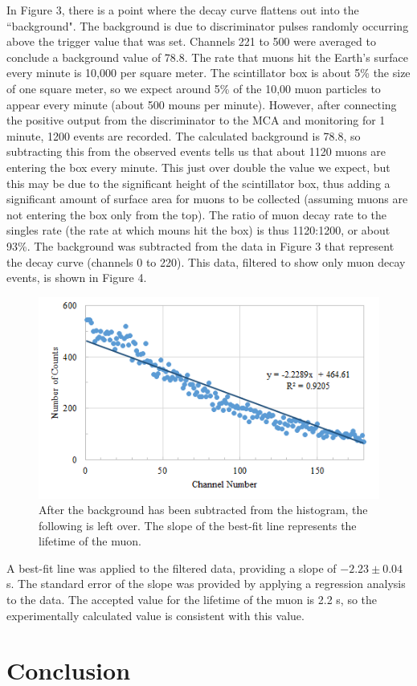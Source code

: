 \documentclass[%
 aip,
 amsmath,amssymb,
 reprint,%
floatfix,
]{revtex4-1}
\begin{document}
In Figure 3, there is a point where the decay curve flattens out into the “background". The background is due to discriminator pulses randomly occurring above the trigger value that was set. Channels 221 to 500 were averaged to conclude a background value of 78.8. The rate that muons hit the Earth's surface every minute is 10,000 per square meter\cite{Wolverton2007}. The scintillator box is about 5\% the size of one square meter, so we expect around 5\% of the 10,00 muon particles to appear every minute (about 500 mouns per minute). However, after connecting the positive output from the discriminator to the MCA and monitoring for 1 minute, 1200 events are recorded. The calculated background is 78.8, so subtracting this from the observed events tells us that about 1120 muons are entering the box every minute. This just over double the value we expect, but this may be due to the significant height of the scintillator box, thus adding a significant amount of surface area for muons to be collected (assuming muons are not entering the box only from the top). The ratio of muon decay rate to the singles rate (the rate at which mouns hit the box) is thus 1120:1200, or about 93\%. The background was subtracted from the data in Figure 3 that represent the decay curve (channels 0 to 220). This data, filtered to show only muon decay events, is shown in Figure 4.

\begin{figure}[H]
	\centering
	\includegraphics[scale=0.8]{filtered.png}
	\caption{After the background has been subtracted from the histogram, the following is left over. The slope of the best-fit line represents the lifetime of the muon.}
\end{figure}

A best-fit line was applied to the filtered data, providing a slope of $-2.23 \pm 0.04$ \textmu s. The standard error of the slope was provided by applying a regression analysis to the data. The accepted value for the lifetime of the muon is 2.2 \textmu s, so the experimentally calculated value is consistent with this value.


\section{\label{sec:level5}Conclusion}


\nocite{*}
\end{document}
